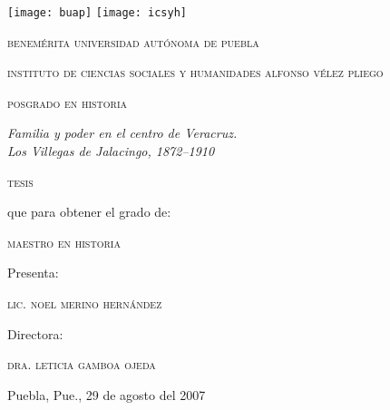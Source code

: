 \documentclass[14pt,twoside,final]{extbook} %
\providecommand\phantomsection{} %
\begin{document}
\setcounter{page}{1}
\newpage
\thispagestyle{empty}
\protect\phantomsection
{}
\begin{center}
\begin{minipage}{11cm}
\texttt{[image: buap]}\label{fig:buap} \hfill \texttt{[image: icsyh]}
\label{fig:icsyh}
\end{minipage}
\end{center}
\protect\smallskip
\begin{center}
\large\scshape benemérita universidad autónoma de puebla
\end{center}
\begin{center}
\large\scshape instituto de ciencias sociales y humanidades \Doubleguillemetleft alfonso vélez pliego\Doubleguillemetright
\end{center}
\begin{center}
\large\scshape posgrado en historia
\end{center}
\protect\bigskip
\begin{center}
\Large\itshape Familia y poder en el centro de Veracruz. \\ Los Villegas de Jalacingo, 1872--1910
\end{center}
\protect\bigskip
\begin{center}
\Large\scshape tesis
\end{center}
\protect\bigskip
\begin{center}
que para obtener el grado de:
\end{center}
\begin{center}
\scshape maestro en historia
\end{center}
\begin{center}
Presenta:
\end{center}
\begin{center}
\scshape lic. noel merino hernández
\end{center}
\begin{center}
Directora:
\end{center}
\begin{center}
\scshape dra. leticia gamboa ojeda
\end{center}
\protect\medskip
\begin{center}
Puebla, Pue., 29 de agosto del 2007
\end{center}
\end{document}
